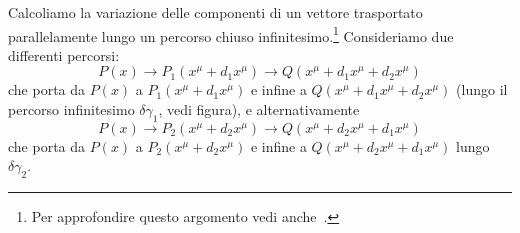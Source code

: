 Calcoliamo la variazione delle componenti di un vettore trasportato
parallelamente lungo un percorso chiuso infinitesimo.\footnote{Per approfondire
  questo argomento vedi anche~\textcite[266]{ohanian:gravitazione}.}
Consideriamo due differenti percorsi:
\begin{equation}
  P(x) \to P_1(x^{\mu} + d_1 x^{\mu}) \to Q(x^{\mu} + d_1 x^{\mu} + d_2 x^{\mu})
\end{equation}
che porta da $P(x)$ a $P_1(x^{\mu} + d_1 x^{\mu})$ e infine a $Q(x^{\mu} + d_1
x^{\mu} + d_2 x^{\mu})$ (lungo il percorso infinitesimo $\delta \gamma_1$, vedi
figura), e alternativamente
\begin{equation}
  P(x)\to  P_2(x^{\mu} + d_2 x^{\mu})\to Q(x^{\mu} + d_2 x^{\mu} + d_1 x^{\mu})
\end{equation}
che porta da $P(x)$ a $P_2(x^{\mu} + d_2 x^{\mu})$ e infine a $Q(x^{\mu} + d_2
x^{\mu} + d_1 x^{\mu})$ lungo $\delta \gamma_{2}$.

